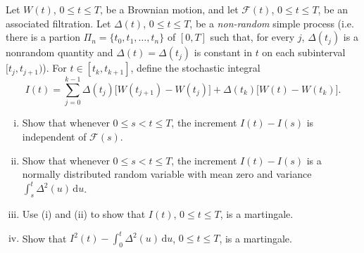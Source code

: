 \documentclass[11pt]{article}
\newcommand\cF{\mathcal{F}}
\newcounter{question}[section]
\begin{document}
    \begin{hwquestion}
        Let $W(t)$, $0 \leq t \leq T$, be a Brownian motion, and let $\cF(t)$, $0 \leq t
        \leq T$, be an associated filtration. Let $\Delta(t)$, $0 \leq t \leq T$, be a
        \emph{non-random} simple process (i.e. there is a partion $\Pi_n = \{ t_0, t_1,
        \dots, t_n \}$ of $[0, T]$ such that, for every $j$, $\Delta(t_j)$ is a nonrandom
        quantity and $\Delta(t) = \Delta(t_j)$ is constant in $t$ on each subinterval
        $[t_{j}, t_{j+1})$). For $t \in [t_{k}, t_{k+1}]$, define the stochastic integral
        \[
            I(t)
            =
            \sum_{j=0}^{k-1}
            \Delta(t_j) \big[ W(t_{j+1}) - W(t_{j}) \big]
            +
            \Delta(t_{k}) \big[ W(t) - W(t_{k}) \big].
        \]

        \vspace{2mm}

        \begin{enumerate}[(i), nolistsep]
            \item Show that whenever $0 \leq s < t \leq T$, the increment $I(t) - I(s)$
            is independent of $\cF(s)$.
            \item Show that whenever $0 \leq s < t \leq T$, the increment $I(t) - I(s)$
            is a normally distributed random variable with mean zero and variance
            $\int_{s}^{t} \Delta^2(u) \, \text{d} u$.
            \item Use (i) and (ii) to show that $I(t)$, $0 \leq t \leq T$, is a martingale.
            \item Show that $I^2(t) - \int_{0}^{t}\Delta^2(u) \, \text{d} u$, $0 \leq t
            \leq T$, is a martingale.
        \end{enumerate}
    \end{hwquestion}
\end{document}
